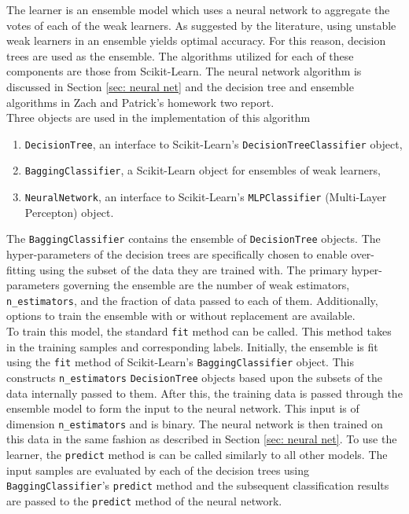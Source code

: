 \documentclass[paper=a4, fontsize=11pt]{scrartcl} %
\begin{document}
The learner is an ensemble model which uses a neural network to aggregate the votes of each of the weak learners.
As suggested by the literature, using unstable weak learners in an ensemble yields optimal accuracy.
For this reason, decision trees are used as the ensemble.
The algorithms utilized for each of these components are those from Scikit-Learn.
The neural network algorithm is discussed in Section \ref{sec: neural net} and the decision tree and ensemble algorithms in Zach and Patrick's homework two report.
\\

Three objects are used in the implementation of this algorithm
\begin{enumerate}
	\item \verb|DecisionTree|, an interface to Scikit-Learn's \verb|DecisionTreeClassifier| object,
	\item \verb|BaggingClassifier|, a Scikit-Learn object for ensembles of weak learners,
	\item \verb|NeuralNetwork|, an interface to Scikit-Learn's \verb|MLPClassifier| (Multi-Layer Percepton) object.
\end{enumerate}
The \verb|BaggingClassifier| contains the ensemble of \verb|DecisionTree| objects.
The hyper-parameters of the decision trees are specifically chosen to enable over-fitting using the subset of the data they are trained with.
The primary hyper-parameters governing the ensemble are the number of weak estimators, \verb|n_estimators|, and the fraction of data passed to each of them.
Additionally, options to train the ensemble with or without replacement are available.
\\

To train this model, the standard \verb|fit| method can be called.
This method takes in the training samples and corresponding labels.
Initially, the ensemble is fit using the \verb|fit| method of Scikit-Learn's \verb|BaggingClassifier| object.
This constructs \verb|n_estimators| \verb|DecisionTree| objects based upon the subsets of the data internally passed to them.
After this, the training data is passed through the ensemble model to form the input to the neural network.
This input is of dimension \verb|n_estimators| and is binary.
The neural network is then trained on this data in the same fashion as described in Section \ref{sec: neural net}.
To use the learner, the \verb|predict| method is can be called similarly to all other models.
The input samples are evaluated by each of the decision trees using \verb|BaggingClassifier|'s \verb|predict| method and the subsequent classification results are passed to the \verb|predict| method of the neural network.
\\
\end{document}
